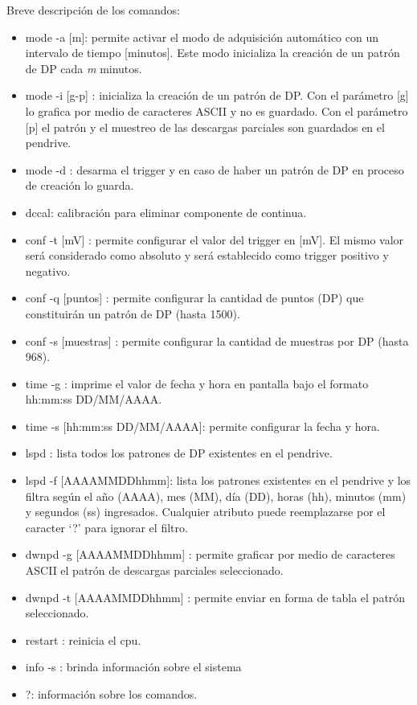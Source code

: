 \vspace{5mm}

Breve descripción de los comandos:
\begin{itemize}
\item mode -a [m]: permite activar el modo de adquisición automático con un intervalo de tiempo [minutos]. Este modo inicializa la creación de un patrón de DP cada \textit{m} minutos.
\item mode -i [g-p] : inicializa la creación de un patrón de DP. Con el parámetro [g] lo grafica por medio de caracteres ASCII y no es guardado. Con el parámetro [p] el patrón y el muestreo de las descargas parciales son guardados en el pendrive.
\item mode -d : desarma el trigger y en caso de haber un patrón de DP en proceso de creación lo guarda.
\item dccal: calibración para eliminar componente de continua.
\item conf -t [mV] : permite configurar el valor del trigger en [mV]. El mismo valor será considerado como absoluto y será establecido como trigger positivo y negativo.
\item conf -q [puntos] : permite configurar la cantidad de puntos (DP) que constituirán un patrón de DP (hasta 1500). 
\item conf -s [muestras] : permite configurar la cantidad de muestras por DP (hasta 968).
\item time -g : imprime el valor de fecha y hora en pantalla bajo el formato hh:mm:ss DD/MM/AAAA.
\item time -s [hh:mm:ss DD/MM/AAAA]: permite configurar la fecha y hora.
\item lspd : lista todos los patrones de DP existentes en el pendrive.
\item lspd -f [AAAAMMDDhhmm]:  lista los patrones existentes en el pendrive y los filtra según el año (AAAA), mes (MM), día (DD), horas (hh), minutos (mm) y segundos (ss) ingresados. Cualquier atributo puede reemplazarse por el caracter ‘?’ para ignorar el filtro.
\item dwnpd -g [AAAAMMDDhhmm] : permite graficar por medio de caracteres ASCII el patrón de descargas parciales seleccionado.
\item dwnpd -t [AAAAMMDDhhmm] : permite enviar en forma de tabla el patrón seleccionado.
\item restart : reinicia el cpu.
\item info -s : brinda información sobre el sistema
\item ?: información sobre los comandos.
\end{itemize}

